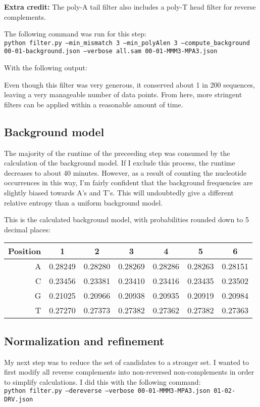 \documentclass[a4paper, 12pt]{report}
\begin{document}
        \textbf{Extra credit:} The poly-A tail filter also includes a poly-T head filter for reverse complements.

        The following command was run for this step: \\
        \texttt{python filter.py --min\_mismatch 3 --min\_polyAlen 3 --compute\_background \\
                00-01-background.json --verbose all.sam 00-01-MMM3-MPA3.json}

        With the following output:
        
        Even though this filter was very generous, it conserved about 1 in 200 sequences,
            leaving a very manageable number of data points.
        From here, more stringent filters can be applied within a reasonable amount of time.

    \subsection{Background model}
        The majority of the runtime of the preceeding step was consumed by the calculation of the background model.
        If I exclude this process, the runtime decreases to about 40 minutes.
        However, as a result of counting the nucleotide occurrences in this way,
            I'm fairly confident that the background frequencies are slightly biased towards A's and T's.
        This will undoubtedly give a different relative entropy than a uniform background model.

        This is the calculated background model, with probabilities rounded down to 5 decimal places: \\
        \begin{tabular}{r*{6}{|c}}
            Position & 1 & 2 & 3 & 4 & 5 & 6 \\ \hline
            A & 0.28249 & 0.28280 & 0.28269 & 0.28286 & 0.28263 & 0.28151 \\ \hline
            C & 0.23456 & 0.23381 & 0.23410 & 0.23416 & 0.23435 & 0.23502 \\ \hline
            G & 0.21025 & 0.20966 & 0.20938 & 0.20935 & 0.20919 & 0.20984 \\ \hline
            T & 0.27270 & 0.27373 & 0.27382 & 0.27362 & 0.27382 & 0.27363
        \end{tabular}

    \subsection{Normalization and refinement}
        My next step was to reduce the set of candidates to a stronger set.
        I wanted to first modify all reverse complements into non-reversed non-complements
            in order to simplify calculations.  I did this with the following command: \\
        \texttt{python filter.py --dereverse --verbose 00-01-MMM3-MPA3.json 01-02-DRV.json}
\end{document}
